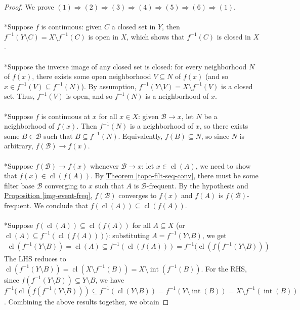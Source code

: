 \documentclass{treatise}
\begin{document}
\begin{proof}
We prove $(1) \Rightarrow (2) \Rightarrow (3) \Rightarrow (4) \Rightarrow (5) \Rightarrow (6) \Rightarrow (1)$.
\\
\\
*Suppose $f$ is continuous: given $C$ a closed set in $Y$, then $f^{-1}(Y \setminus C) = X \setminus f^{-1}(C)$ is open in $X$, which shows that $f^{-1}(C)$ is closed in $X$.
\\
\\
*Suppose the inverse image of any closed set is closed: for every neighborhood $N$ of $f(x)$, there exists some open neighborhood $V \subseteq N$ of $f(x)$ (and so $x \in f^{-1}(V) \subseteq f^{-1}(N)$). By assumption, $f^{-1}(Y \setminus V) = X \setminus f^{-1}(V)$ is a closed set. Thus, $f^{-1}(V)$ is open, and so $f^{-1}(N)$ is a neighborhood of $x$.
\\
\\
*Suppose $f$ is continuous at $x$ for all $x \in X$: given $\mathcal{B} \to x$, let $N$ be a neighborhood of $f(x)$. Then $f^{-1}(N)$ is a neighborhood of $x$, so there exists some $B \in \mathcal{B}$ such that $B \subseteq f^{-1}(N)$. Equivalently, $f(B) \subseteq N$, so since $N$ is arbitrary, $f(\mathcal{B}) \to f(x)$.
\\
\\
*Suppose $f(\mathcal{B}) \to f(x)$ whenever $\mathcal{B} \to x$: let $x \in \operatorname{cl}(A)$, we need to show that $f(x) \in \operatorname{cl}(f(A))$. By \hyperref[topo-filt-seq-conv]{Theorem \ref*{topo-filt-seq-conv}}, there must be some filter base $\mathcal{B}$ converging to $x$ such that $A$ is $\mathcal{B}$-frequent. By the hypothesis and \hyperref[img-event-freq]{Proposition \ref*{img-event-freq}}, $f(\mathcal{B})$ converges to $f(x)$ and $f(A)$ is $f(\mathcal{B})$-frequent. We conclude that $f(\operatorname{cl}(A)) \subseteq \operatorname{cl}(f(A))$.
\\
\\
*Suppose $f(\operatorname{cl}(A)) \subseteq \operatorname{cl}(f(A))$ for all $A \subseteq X$ (or $\operatorname{cl}(A) \subseteq f^{-1}(\operatorname{cl}(f(A)))$): substituting $A = f^{-1}(Y \setminus B)$, we get
\begin{align*}
    \operatorname{cl}(f^{-1}(Y \setminus B)) = \operatorname{cl}(A) \subseteq f^{-1}(\operatorname{cl}(f(A))) = f^{-1}(\operatorname{cl}(f(f^{-1}(Y \setminus B)))
\end{align*}
The LHS reduces to $\operatorname{cl}(f^{-1}(Y \setminus B)) = \operatorname{cl}(X \setminus f^{-1}(B)) = X \setminus \operatorname{int}(f^{-1}(B))$. For the RHS, since $f(f^{-1}(Y \setminus B)) \subseteq Y \setminus B$, we have $f^{-1}(\operatorname{cl}(f(f^{-1}(Y \setminus B))) \subseteq f^{-1}(\operatorname{cl}(Y \setminus B)) = f^{-1}(Y \setminus \operatorname{int}(B)) = X \setminus f^{-1}(\operatorname{int}(B))$. Combining the above results together, we obtain

\end{proof}
\end{document}
